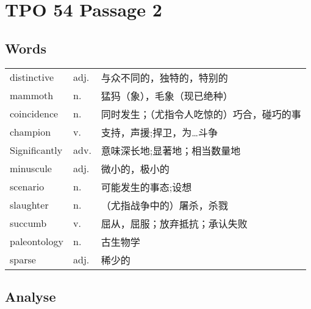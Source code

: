 \section{TPO 54 Passage 2}

\subsection{Words}

\begin{tabular}{lll}
    distinctive   & adj. & 与众不同的，独特的，特别的         \\
    mammoth       & n.   & 猛犸（象），毛象（现已绝种）        \\
    coincidence   & n.   & 同时发生；（尤指令人吃惊的）巧合，碰巧的事 \\
    champion      & v.   & 支持，声援;捍卫，为…斗争         \\
    Significantly & adv. & 意味深长地;显著地；相当数量地       \\
    minuscule     & adj. & 微小的，极小的               \\
    scenario      & n.   & 可能发生的事态;设想            \\
    slaughter     & n.   & （尤指战争中的）屠杀，杀戮         \\
    succumb       & v.   & 屈从，屈服；放弃抵抗；承认失败       \\
    paleontology  & n.   & 古生物学                  \\
    sparse        & adj. & 稀少的                   \\
\end{tabular}

\subsection{Analyse}

